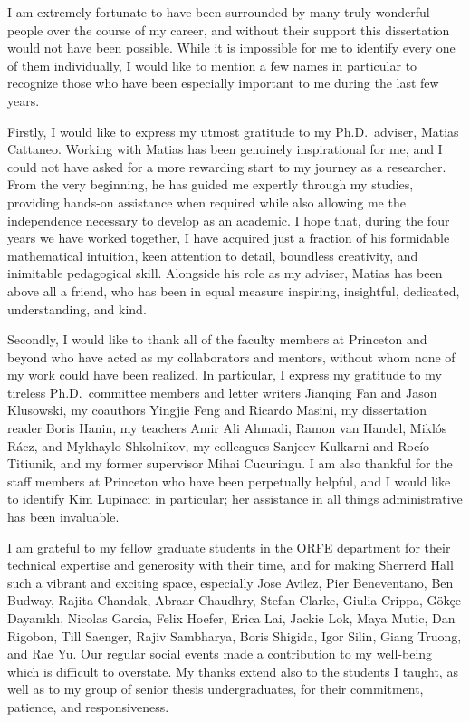 
I am extremely fortunate to have been surrounded by many truly wonderful people
over the course of my career, and without their support this dissertation would
not have been possible. While it is impossible for me to identify every one of
them individually, I would like to mention a few names in particular to
recognize those who have been especially important to me during the last few
years.

Firstly, I would like to express my utmost gratitude to my Ph.D.\ adviser,
Matias Cattaneo. Working with Matias has been genuinely inspirational for me,
and I could not have asked for a more rewarding start to my journey as a
researcher. From the very beginning, he has guided me expertly through my
studies, providing hands-on assistance when required while also allowing me the
independence necessary to develop as an academic. I hope that, during the four
years we have worked together, I have acquired just a fraction of his formidable
mathematical intuition, keen attention to detail, boundless creativity, and
inimitable pedagogical skill. Alongside his role as my adviser, Matias has been
above all a friend, who has been in equal measure inspiring,
insightful, dedicated, understanding, and kind.

Secondly, I would like to thank all of the faculty members at Princeton and
beyond who have acted as my collaborators and mentors, without whom none of my
work could have been realized. In particular, I express my gratitude to my
tireless Ph.D.\ committee members and letter writers Jianqing Fan and Jason
Klusowski, my coauthors Yingjie Feng and Ricardo Masini, my dissertation reader
Boris Hanin, my teachers
Amir Ali Ahmadi, Ramon van Handel, Mikl{\'o}s R{\'a}cz, and Mykhaylo Shkolnikov,
my colleagues Sanjeev Kulkarni and Roc{\'i}o Titiunik,
and my former supervisor Mihai Cucuringu.
I am also thankful for the staff members at Princeton who have been
perpetually helpful, and I would like to identify Kim
Lupinacci in particular; her assistance in all things administrative has been
invaluable.

I am grateful to my fellow graduate students in the ORFE department for their
technical expertise and generosity with their time, and for making Sherrerd
Hall such a vibrant and exciting space, especially
Jose Avilez,
Pier Beneventano,
Ben Budway,
Rajita Chandak,
Abraar Chaudhry,
Stefan Clarke,
Giulia Crippa,
G{\"o}k{\c c}e Dayan{\i}kl{\i},
Nicolas Garcia,
Felix Hoefer,
Erica Lai,
Jackie Lok,
Maya Mutic,
Dan Rigobon,
Till Saenger,
Rajiv Sambharya,
Boris Shigida,
Igor Silin,
Giang Truong,
and Rae Yu.
Our
regular social events made a contribution to my well-being which is difficult
to overstate. My thanks extend also to the students I taught, as
well as to my group of senior thesis undergraduates, for their commitment,
patience, and responsiveness.

